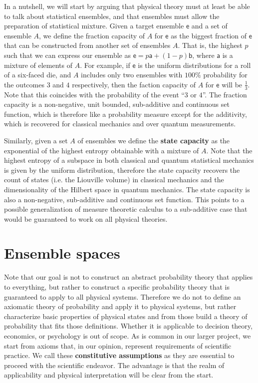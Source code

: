 \documentclass[10pt,twocolumn, nofootinbib]{revtex4-2}
\newcommand{\ens}[1][e] {\mathsf{#1}} %
\begin{document}
In a nutshell, we will start by arguing that physical theory must at least be able to talk about statistical ensembles, and that ensembles must allow the preparation of statistical mixture. Given a target ensemble $\ens$ and a set of ensemble $A$, we define the fraction capacity of $A$ for $\ens$ as the biggest fraction of $\ens$ that can be constructed from another set of ensembles $A$. That is, the highest $p$ such that we can express our ensemble as $\ens = p \ens[a] + (1-p) \ens[b]$, where $\ens[a]$ is a mixture of elements of $A$. For example, if $\ens$ is the uniform distributions for a roll of a six-faced die, and $A$ includes only two ensembles with $100\%$ probability for the outcomes $3$ and $4$ respectively, then the faction capacity of $A$ for $\ens$ will be $\frac{1}{3}$. Note that this coincides with the probability of the event ``$3$ or $4$''. The fraction capacity is a non-negative, unit bounded, sub-additive and continuous set function, which is therefore like a probability measure except for the additivity, which is recovered for classical mechanics and over quantum measurements.

Similarly, given a set $A$ of ensembles we define the \textbf{state capacity} as the exponential of the highest entropy obtainable with a mixture of $A$. Note that the highest entropy of a subspace in both classical and quantum statistical mechanics is given by the uniform distribution, therefore the state capacity recovers the count of states (i.e. the Liouville volume) in classical mechanics and the dimensionality of the Hilbert space in quantum mechanics. The state capacity is also a non-negative, sub-additive and continuous set function. This points to a possible generalization of measure theoretic calculus to a sub-additive case that would be guaranteed to work on all physical theories.

\section{Ensemble spaces}

Note that our goal is not to construct an abstract probability theory that applies to everything, but rather to construct a specific probability theory that is guaranteed to apply to all physical systems. Therefore we do not to define an axiomatic theory of probability and apply it to physical systems, but rather characterize basic properties of physical states and from those build a theory of probability that fits those definitions. Whether it is applicable to decision theory, economics, or psychology is out of scope. As is common in our larger project, we start from axioms that, in our opinion, represent requirements of scientific practice. We call these \textbf{constitutive assumptions} as they are essential to proceed with the scientific endeavor. The advantage is that the realm of applicability and physical interpretation will be clear from the start. 
\end{document}

